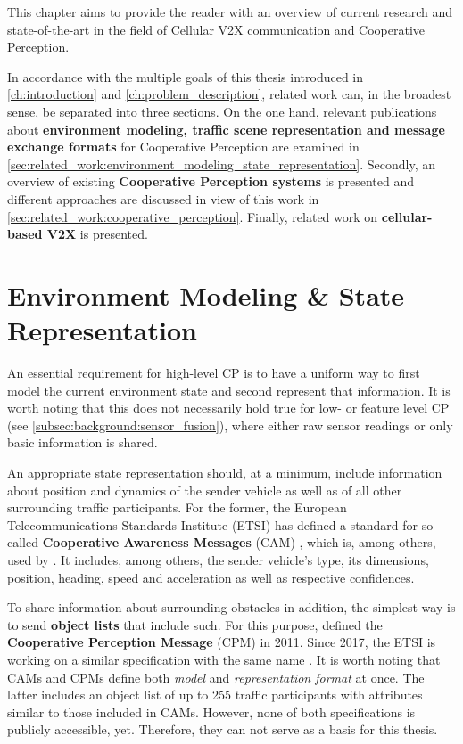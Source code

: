 This chapter aims to provide the reader with an overview of current research and state-of-the-art in the field of Cellular V2X communication and Cooperative Perception.
\par
\bigskip

In accordance with the multiple goals of this thesis introduced in \autoref{ch:introduction} and \autoref{ch:problem_description}, related work can, in the broadest sense, be separated into three sections. On the one hand, relevant publications about \textbf{environment modeling, traffic scene representation and message exchange formats} for Cooperative Perception are examined in \autoref{sec:related_work:environment_modeling_state_representation}. Secondly, an overview of existing \textbf{Cooperative Perception systems} is presented and different approaches are discussed in view of this work in \autoref{sec:related_work:cooperative_perception}. Finally, related work on \textbf{cellular-based V2X} is presented.

\section{Environment Modeling \& State Representation}
\label{sec:related_work:environment_modeling_state_representation}
An essential requirement for high-level CP is to have a uniform way to first model the current environment state and second represent that information. It is worth noting that this does not necessarily hold true for low- or feature level CP (see \autoref{subsec:background:sensor_fusion}), where either raw sensor readings or only basic information is shared.

An appropriate state representation should, at a minimum, include information about position and dynamics of the sender vehicle as well as of all other surrounding traffic participants. For the former, the European Telecommunications Standards Institute (ETSI) has defined a standard for so called \textbf{Cooperative Awareness Messages} (CAM) \cite{EuropeanTelecommunicationsStandardsInstituteETSI2011}, which is, among others, used by \cite{Rauch2011}. It includes, among others, the sender vehicle's type, its dimensions, position, heading, speed and acceleration as well as respective confidences.

To share information about surrounding obstacles in addition, the simplest way is to send \textbf{object lists} that include such. For this purpose, \cite{Rauch2011} defined the \textbf{Cooperative Perception Message} (CPM) in 2011. Since 2017, the ETSI is working on a similar specification with the same name \cite{EuropeanTelecommunicationsStandardsInstituteETSI2019}. It is worth noting that CAMs and CPMs define both \textit{model} and \textit{representation format} at once. The latter includes an object list of up to 255 traffic participants \cite{Thandavarayan2019} with attributes similar to those included in CAMs. However, none of both specifications is publicly accessible, yet. Therefore, they can not serve as a basis for this thesis.


